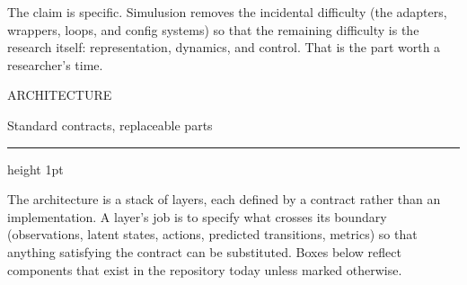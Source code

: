 \documentclass[10pt,a4paper]{article}
\newcommand{\kicker}[1]{{\footnotesize\displayfont\color{accent}\MakeUppercase{#1}}}
\newcommand{\pagetitle}[2]{%
  \kicker{#1}\par\vspace{1.5mm}
  {\Huge\displayfont\color{ink} #2}\par\vspace{2.5mm}
  {\color{rule}\hrule height 1pt}\par\vspace{4mm}}
\begin{document}
\vspace{3mm}
{\footnotesize
The claim is specific. Simulusion removes the incidental difficulty (the adapters, wrappers, loops,
and config systems) so that the remaining difficulty is the research itself: representation,
dynamics, and control. That is the part worth a researcher's time.}

\newpage
\pagetitle{Architecture}{Standard contracts, replaceable parts}

{\footnotesize
The architecture is a stack of layers, each defined by a contract rather than an implementation.
A layer's job is to specify what crosses its boundary (observations, latent states, actions,
predicted transitions, metrics) so that anything satisfying the contract can be substituted.
Boxes below reflect components that exist in the repository today unless marked otherwise.}

\vspace{3.5mm}
\end{document}
